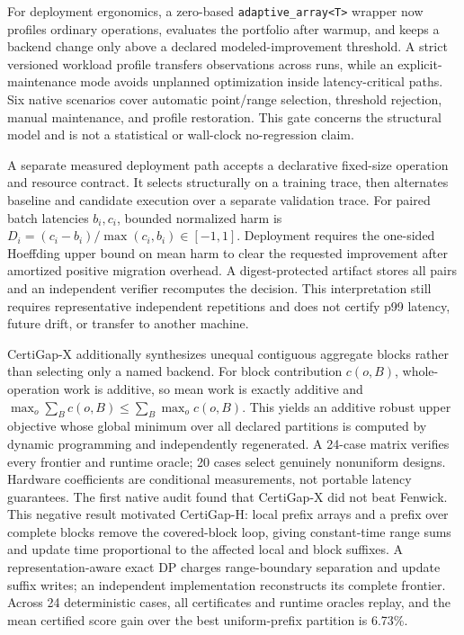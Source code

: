 \documentclass[10pt]{article}
\begin{document}
For deployment ergonomics, a zero-based \texttt{adaptive\_array<T>} wrapper now
profiles ordinary operations, evaluates the portfolio after warmup, and keeps a
backend change only above a declared modeled-improvement threshold. A strict
versioned workload profile transfers observations across runs, while an
explicit-maintenance mode avoids unplanned optimization inside latency-critical
paths. Six native scenarios cover automatic point/range selection, threshold
rejection, manual maintenance, and profile restoration. This gate concerns the
structural model and is not a statistical or wall-clock no-regression claim.

A separate measured deployment path accepts a declarative fixed-size operation
and resource contract. It selects structurally on a training trace, then
alternates baseline and candidate execution over a separate validation trace.
For paired batch latencies $b_i,c_i$, bounded normalized harm is
$D_i=(c_i-b_i)/\max(c_i,b_i)\in[-1,1]$. Deployment requires the one-sided
Hoeffding upper bound on mean harm to clear the requested improvement after
amortized positive migration overhead. A digest-protected artifact stores all
pairs and an independent verifier recomputes the decision. This interpretation
still requires representative independent repetitions and does not certify
p99 latency, future drift, or transfer to another machine.

CertiGap-X additionally synthesizes unequal contiguous aggregate blocks
rather than selecting only a named backend. For block contribution
$c(o,B)$, whole-operation work is additive, so mean work is exactly additive
and $\max_o\sum_B c(o,B)\leq\sum_B\max_o c(o,B)$. This yields an additive
robust upper objective whose global minimum over all declared partitions is
computed by dynamic programming and independently regenerated. A 24-case
matrix verifies every frontier and runtime oracle; 20 cases select genuinely
nonuniform designs. Hardware coefficients are conditional measurements, not
portable latency guarantees. The first native audit found that CertiGap-X did
not beat Fenwick. This negative result motivated CertiGap-H: local prefix
arrays and a prefix over complete blocks remove the covered-block loop,
giving constant-time range sums and update time proportional to the affected
local and block suffixes. A representation-aware exact DP charges
range-boundary separation and update suffix writes; an independent
implementation reconstructs its complete frontier. Across 24 deterministic
cases, all certificates and runtime oracles replay, and the mean certified
score gain over the best uniform-prefix partition is 6.73\%.
\end{document}
